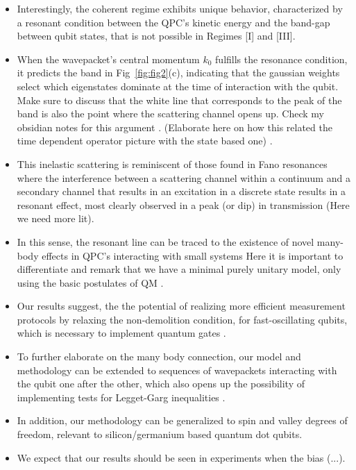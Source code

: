\documentclass[10pt,
 amsmath,amssymb,
 aps,prb, twocolumn
]{revtex4-2}
\newcommand\sj[1]{ {\color{cyan} #1} }
\begin{document}
\begin{itemize}
    \item Interestingly, the coherent regime exhibits unique behavior, characterized by a resonant condition between the QPC's kinetic energy and the band-gap between qubit states, that is not possible in Regimes [I] and [III].

     \item When the wavepacket's central momentum $k_0$ fulfills the resonance condition, it predicts the band in Fig~\ref{fig:fig2}(c), indicating that the gaussian weights select which eigenstates dominate at the time of interaction with the qubit. \sj{Make sure to discuss that the white line that corresponds to the peak of the band is also the point where the scattering channel opens up. Check my obsidian notes for this argument}. \sj{(Elaborate here on how this related the time dependent operator picture with the state based one)}.

    \item This inelastic scattering is reminiscent of those found in Fano resonances where the interference between a scattering channel within a continuum and a secondary channel that results in an excitation in a discrete state results in a resonant effect, most clearly observed in a peak (or dip) in transmission \cite{kobayashiFano2004} (Here we need more lit).

    \item In this sense, the resonant line can be traced to the existence of novel many-body effects in QPC's interacting with small systems \cite{ouyangBackaction2010, youngInelasticBackaction2010, snymanPolarization2007} \sj{Here it is important to differentiate and remark that we have a minimal purely unitary model, only using the basic postulates of QM}.

    \item Our results suggest, the the potential of realizing more efficient measurement protocols by relaxing the non-demolition condition, for fast-oscillating qubits, which is necessary to implement quantum gates \cite{wangExperimentalNonadiabatic2016}. 

    \item To further elaborate on the many body connection, our model and methodology can be extended to sequences of wavepackets interacting with the qubit one after the other, which also opens up the possibility of implementing tests for Legget-Garg inequalities \cite{jordan2008}.

    \item In addition, our methodology can be generalized to spin and valley degrees of freedom, relevant to silicon/germanium based quantum dot qubits.

    \item We expect that our results should be seen in experiments when the bias (...).
\end{itemize}
\end{document}
